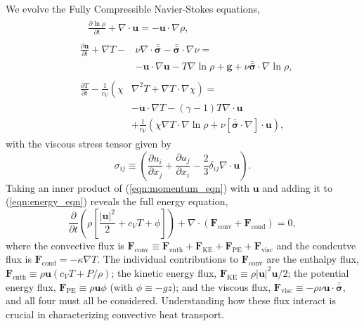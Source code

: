 \documentclass[aps, prl, twocolumn, nofootinbib, groupedaddress, amsfonts, amssymb, amsmath]{revtex4-1}
\newcommand{\Div}[1]{\ensuremath{\nabla\cdot\left( #1\right)}}
\newcommand{\grad}{\ensuremath{\nabla}}
\newcommand{\lilstressT}{\ensuremath{\bm{\bar{\bar{\sigma}}}}}
\begin{document}
We evolve the Fully Compressible Navier-Stokes equations,
\begin{align}
&\begin{aligned}
&\frac{\partial \ln\rho}{\partial t} + \grad\cdot\bm{u} 
    = -\bm{u}\cdot\grad\rho,
	\label{eqn:continuity_eqn}
\end{aligned}\\
&\begin{aligned}
\frac{\partial\bm{u}}{\partial t} + \grad T - 
&\nu\grad\cdot\lilstressT - \lilstressT\cdot\grad\nu = \\
&-\bm{u}\cdot\grad\bm{u} - T\grad\ln\rho + \bm{g} + 
\nu\lilstressT\cdot\grad\ln\rho,
\label{eqn:momentum_eqn}
\end{aligned}\\
&\begin{aligned}
\frac{\partial T}{\partial t} -\frac{1}{c_V}\left(\right.\chi&\left.
    \grad^2 T + \grad T\cdot\grad\chi\right) = \\
	&-\bm{u}\cdot\grad T - (\gamma-1)T\grad\cdot{\bm{u}} \\
	&+ \frac{1}{c_V}\left(\chi\grad T \cdot\grad\ln\rho +
	\nu\left[\lilstressT\cdot\nabla\right]\cdot\bm{u}\right), 
	\label{eqn:energy_eqn}
\end{aligned}
\end{align}
with the viscous stress tensor given by
\begin{equation}
\sigma_{ij} \equiv \left(\frac{\partial u_i}{\partial x_j} + 
\frac{\partial u_j}{\partial x_i} - \frac{2}{3}\delta_{ij}\grad\cdot\bm{u}\right).
	\label{eqn:stress_tensor}
\end{equation}
Taking an inner product of
(\ref{eqn:momentum_eqn}) with $\bm{u}$ and adding it to 
(\ref{eqn:energy_eqn}) reveals the full energy equation,
\begin{equation}
\frac{\partial}{\partial t}\left(\rho\left[\frac{|\bm{u}|^2}{2} + c_V T + \phi\right]\right) +
\Div{\bm{F}_{\text{conv}} + \bm{F}_{\text{cond}}} = 0,
	\label{eqn:energy_eqn_full}
\end{equation}
where the convective flux is
$
\bm{F}_{\text{conv}} \equiv \bm{F}_{\text{enth}} + \bm{F}_{\text{KE}} + \bm{F}_{\text{PE}} + \bm{F}_{\text{visc}}
$
and the condcutve flux is $\bm{F}_{\text{cond}} = -\kappa \grad T$.
The individual contributions to $\bm{F}_{\text{conv}}$ are the enthalpy flux, 
$\bm{F}_{\text{enth}} \equiv \rho\bm{u}(c_V T + P/\rho)$;
the kinetic energy flux, 
$\bm{F}_{\text{KE}} \equiv \rho|\bm{u}|^2\bm{u}/2$;
the potential energy flux,
$\bm{F}_{\text{PE}} \equiv \rho\bm{u}\phi$ (with $\phi \equiv -gz$);
and the viscous flux, 
$\bm{F}_{\text{visc}} \equiv -\rho\nu\bm{u}\cdot\lilstressT$, and all four
must all be considered. 
Understanding how these flux interact  
is crucial in characterizing convective heat transport.
\end{document}
